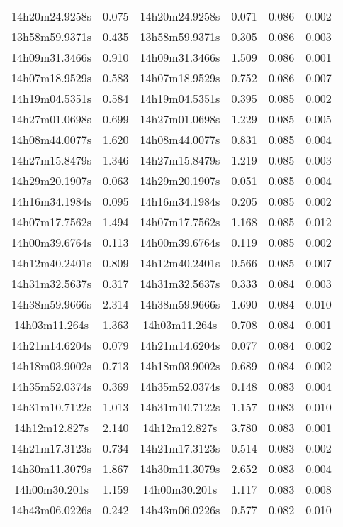 \begin{table}
\begin{tabular}{cccccc}
14h20m24.9258s & 0.075 & 14h20m24.9258s & 0.071 & 0.086 & 0.002 \\
13h58m59.9371s & 0.435 & 13h58m59.9371s & 0.305 & 0.086 & 0.003 \\
14h09m31.3466s & 0.910 & 14h09m31.3466s & 1.509 & 0.086 & 0.001 \\
14h07m18.9529s & 0.583 & 14h07m18.9529s & 0.752 & 0.086 & 0.007 \\
14h19m04.5351s & 0.584 & 14h19m04.5351s & 0.395 & 0.085 & 0.002 \\
14h27m01.0698s & 0.699 & 14h27m01.0698s & 1.229 & 0.085 & 0.005 \\
14h08m44.0077s & 1.620 & 14h08m44.0077s & 0.831 & 0.085 & 0.004 \\
14h27m15.8479s & 1.346 & 14h27m15.8479s & 1.219 & 0.085 & 0.003 \\
14h29m20.1907s & 0.063 & 14h29m20.1907s & 0.051 & 0.085 & 0.004 \\
14h16m34.1984s & 0.095 & 14h16m34.1984s & 0.205 & 0.085 & 0.002 \\
14h07m17.7562s & 1.494 & 14h07m17.7562s & 1.168 & 0.085 & 0.012 \\
14h00m39.6764s & 0.113 & 14h00m39.6764s & 0.119 & 0.085 & 0.002 \\
14h12m40.2401s & 0.809 & 14h12m40.2401s & 0.566 & 0.085 & 0.007 \\
14h31m32.5637s & 0.317 & 14h31m32.5637s & 0.333 & 0.084 & 0.003 \\
14h38m59.9666s & 2.314 & 14h38m59.9666s & 1.690 & 0.084 & 0.010 \\
14h03m11.264s & 1.363 & 14h03m11.264s & 0.708 & 0.084 & 0.001 \\
14h21m14.6204s & 0.079 & 14h21m14.6204s & 0.077 & 0.084 & 0.002 \\
14h18m03.9002s & 0.713 & 14h18m03.9002s & 0.689 & 0.084 & 0.002 \\
14h35m52.0374s & 0.369 & 14h35m52.0374s & 0.148 & 0.083 & 0.004 \\
14h31m10.7122s & 1.013 & 14h31m10.7122s & 1.157 & 0.083 & 0.010 \\
14h12m12.827s & 2.140 & 14h12m12.827s & 3.780 & 0.083 & 0.001 \\
14h21m17.3123s & 0.734 & 14h21m17.3123s & 0.514 & 0.083 & 0.002 \\
14h30m11.3079s & 1.867 & 14h30m11.3079s & 2.652 & 0.083 & 0.004 \\
14h00m30.201s & 1.159 & 14h00m30.201s & 1.117 & 0.083 & 0.008 \\
14h43m06.0226s & 0.242 & 14h43m06.0226s & 0.577 & 0.082 & 0.010 \\

\end{tabular}
\end{table}
